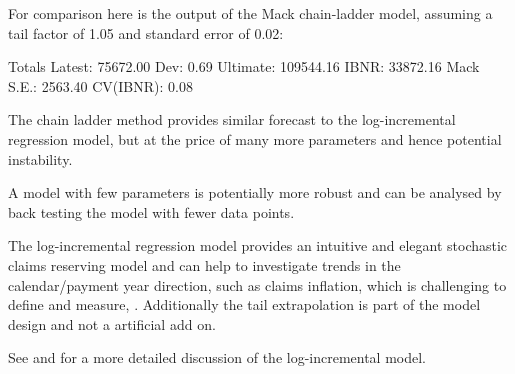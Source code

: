 \documentclass{article}
\begin{document}
For comparison here is the output of the Mack chain-ladder model, assuming a
tail factor of 1.05 and standard error of 0.02: 
\begin{Schunk}
\begin{Soutput}
              Totals
Latest:     75672.00
Dev:            0.69
Ultimate:  109544.16
IBNR:       33872.16
Mack S.E.:   2563.40
CV(IBNR):       0.08
\end{Soutput}
\end{Schunk}
The chain ladder method provides similar forecast to the
log-incremental regression model, but at the price of many more
parameters and hence potential instability. 

A model with few parameters is potentially more robust and can be analysed by
back testing the model with fewer data points.

The log-incremental regression model provides an intuitive 
and elegant stochastic claims reserving model and can help to investigate 
trends in the calendar/payment year direction, such as claims inflation, which is
challenging to define and measure, \cite{GesmannRayeesClapham2013}. 
Additionally the tail extrapolation is part of the model design and not a 
artificial add on. 

See \cite{Christofides1997} and \cite{Zehnwirth1994} for a more detailed 
discussion of the log-incremental model.



\end{document}
